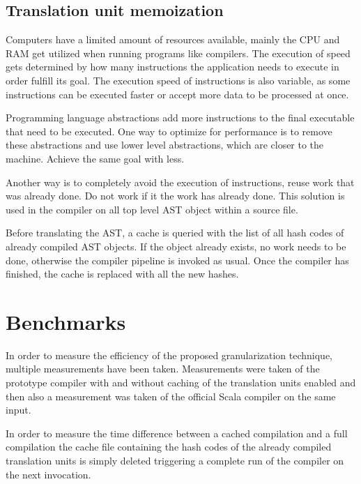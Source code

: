 \documentclass{VUMIFPSbakalaurinis}
\begin{document}
\subsection{Translation unit memoization}

Computers have a limited amount of resources available, mainly the CPU and RAM get utilized when running programs like compilers.
The execution of speed gets determined by how many instructions the application needs to execute in order fulfill its goal.
The execution speed of instructions is also variable, as some instructions can be executed faster or accept more data to be processed at once.

Programming language abstractions add more instructions to the final executable that need to be executed.
One way to optimize for performance is to remove these abstractions and use lower level abstractions, which are closer to the machine.
Achieve the same goal with less.%

Another way is to completely avoid the execution of instructions, reuse work that was already done.
Do not work if it the work has already done.
This solution is used in the compiler on all top level AST object within a source file.

Before translating the AST, a cache is queried with the list of all hash codes of already compiled AST objects.
If the object already exists, no work needs to be done, otherwise the compiler pipeline is invoked as usual.
Once the compiler has finished, the cache is replaced with all the new hashes.

\section{Benchmarks}
In order to measure the efficiency of the proposed granularization technique, multiple measurements have been taken.
Measurements were taken of the prototype compiler with and without caching of the translation units enabled and then also a measurement was taken of the official Scala compiler on the same input.

In order to measure the time difference between a cached compilation and a full compilation the cache file containing the hash codes of the already compiled translation units is simply deleted triggering a complete run of the compiler on the next invocation.
\end{document}
